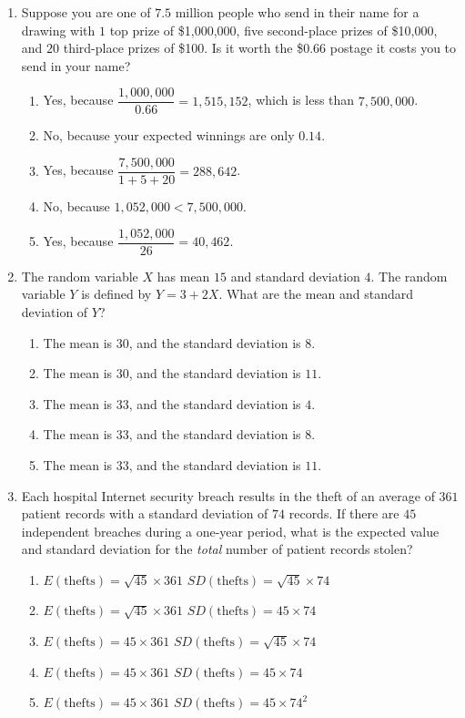 \documentclass{article}
\begin{document}
\begin{enumerate}[label=\textbf{S\arabic*.}]
\item Suppose you are one of $7.5$ million people who send in their name for a drawing with $1$ top prize of \$1{,}000{,}000, five second-place prizes of \$10{,}000, and $20$ third-place prizes of \$100. Is it worth the \$0.66 postage it costs you to send in your name? 
\begin{enumerate}
  \item Yes, because $\dfrac{1,000,000}{0.66} = 1,515,152$, which is less than $7,500,000$.
  \item No, because your expected winnings are only $0.14$.
  \item Yes, because $\dfrac{7,500,000}{1+5+20} = 288,642$.
  \item No, because $1,052,000 < 7,500,000$.
  \item Yes, because $\dfrac{1,052,000}{26} = 40,462$.
\end{enumerate}

\item The random variable $X$ has mean $15$ and standard deviation $4$. The random variable $Y$ is defined by $Y=3+2X$. What are the mean and standard deviation of $Y$? 
\begin{enumerate}
  \item The mean is $30$, and the standard deviation is $8$.
  \item The mean is $30$, and the standard deviation is $11$.
  \item The mean is $33$, and the standard deviation is $4$.
  \item The mean is $33$, and the standard deviation is $8$.
  \item The mean is $33$, and the standard deviation is $11$.
\end{enumerate}

\item Each hospital Internet security breach results in the theft of an average of $361$ patient records with a standard deviation of $74$ records. If there are $45$ independent breaches during a one-year period, what is the expected value and standard deviation for the \emph{total} number of patient records stolen? 
\begin{enumerate}
  \item $E(\text{thefts})=\sqrt{45}\times361$ $SD(\text{thefts})=\sqrt{45}\times74$
  \item $E(\text{thefts})=\sqrt{45}\times361$ $SD(\text{thefts})=45\times74$
  \item $E(\text{thefts})=45\times361$ $SD(\text{thefts})=\sqrt{45}\times74$
  \item $E(\text{thefts})=45\times361$ $SD(\text{thefts})=45\times74$
  \item $E(\text{thefts})=45\times361$ $SD(\text{thefts})=45\times74^{2}$
\end{enumerate}


\end{enumerate}
\end{document}
